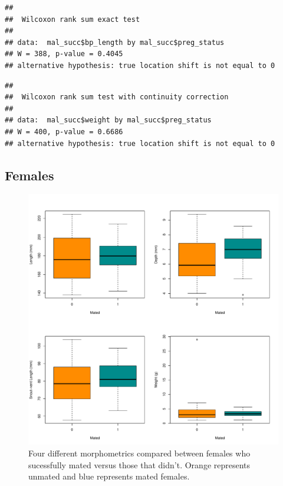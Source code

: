 \documentclass[
]{article}
\begin{document}
\begin{verbatim}
## 
##  Wilcoxon rank sum exact test
## 
## data:  mal_succ$bp_length by mal_succ$preg_status
## W = 388, p-value = 0.4045
## alternative hypothesis: true location shift is not equal to 0
\end{verbatim}

\begin{verbatim}
## 
##  Wilcoxon rank sum test with continuity correction
## 
## data:  mal_succ$weight by mal_succ$preg_status
## W = 400, p-value = 0.6686
## alternative hypothesis: true location shift is not equal to 0
\end{verbatim}

\hypertarget{females-1}{%
\subsection{Females}\label{females-1}}

\begin{figure}
\centering
\includegraphics{selection_analysis_floridae_files/figure-latex/mat-status-morph-fem-1.pdf}
\caption{\label{fig:mat-status-morph-fem}Four different morphometrics compared between females who sucessfully mated versus those that didn't. Orange represents unmated and blue represents mated females.}
\end{figure}
\end{document}
